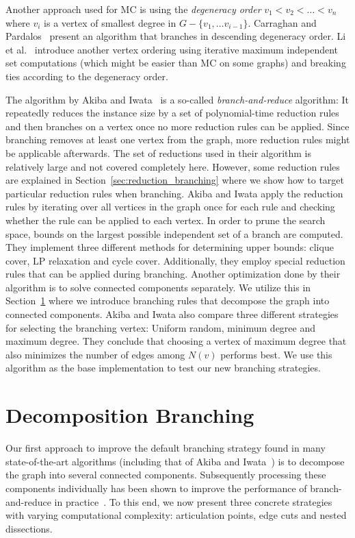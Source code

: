 \documentclass[a4paper,UKenglish,cleveref, autoref, thm-restate]{lipics-v2021}
\begin{document}
Another approach used for MC is using the \emph{degeneracy order} $v_1 < v_2 <
\dots < v_n$ where $v_i$ is a vertex of smallest degree in $G - \{v_1, \dots
v_{i-1}\}$. Carraghan and Pardalos~\cite{CarraghanPardalos} present an algorithm
that branches in descending degeneracy order. Li et al.~\cite{LiFangXu}
introduce another vertex ordering using iterative maximum independent set
computations (which might be easier than MC on some graphs) and breaking ties
according to the degeneracy order.


The algorithm by Akiba and Iwata~\cite{AkibaIwata} is a so-called
\emph{branch-and-reduce} algorithm: It repeatedly reduces the instance size by a
set of polynomial-time reduction rules and then branches on a vertex once no
more reduction rules can be applied. Since branching removes at least one vertex
from the graph, more reduction rules might be applicable afterwards. The
set of reductions used in their algorithm is relatively large and not covered
completely here. However, some reduction rules are explained in
Section~\ref{sec:reduction_branching} where we show how to target particular reduction
rules when branching. Akiba and Iwata apply the reduction rules by iterating over all
vertices in the graph once for each rule and checking whether the rule
can be applied to each vertex. In order to prune the search space, bounds on the largest
possible independent set of a branch are computed. They implement three different
methods for determining upper bounds: clique cover, LP relaxation and cycle
cover. Additionally, they employ special reduction rules that can be applied
during branching. Another optimization done by their algorithm is to solve
connected components separately. We utilize this in
Section~\ref{sec:decomposition_branching} where we introduce branching rules
that decompose the graph into connected components. Akiba and Iwata also
compare three different strategies for
selecting the branching vertex: Uniform random, minimum degree and maximum
degree. They conclude that choosing a vertex of maximum degree that also
minimizes the number of edges among $N(v)$ performs best. We use this algorithm
as the base implementation to test our new branching strategies.

\section{Decomposition Branching}\label{sec:decomposition_branching}
Our first approach to improve the default branching strategy found in many state-of-the-art algorithms (including that of Akiba and Iwata~\cite{AkibaIwata}) is to decompose the graph into several connected components.
Subsequently processing these components individually has been shown to improve the performance of branch-and-reduce in practice~\cite{alsahafy2020computing}.
To this end, we now present three concrete strategies with varying computational
complexity: articulation points, edge cuts and nested dissections.
\end{document}
